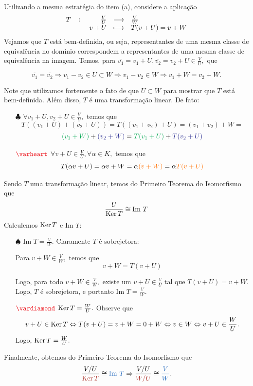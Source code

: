 \documentclass[11pt,a4paper]{article}
\begin{document}
{{    \task[\pers{b}] Utilizando a mesma estratégia do item (a), considere a aplicação
    \[
    \fullfunction{T}{\frac{V}{U}}{\frac{V}{W}}{v + U}{T(v + U) = v + W}
    \]
    }
    Vejamos que $T$ está bem-definida, ou seja, representantes de uma mesma classe de equivalência no domínio correspondem a representantes de uma mesma classe de equivalência na imagem. Temos, para $\overline{v_1} = v_1 + U, \overline{v_2} = v_2 + U \in \frac{V}{U},$ que
    
    \[
    \overline{v_1} = \overline{v_2} \Rightarrow v_1 - v_2 \in U \subset W \Rightarrow v_1 - v_2 \in W \Rightarrow v_1 + W = v_2 + W.
    \]
    
    Note que utilizamos fortemente o fato de que $U \subset W$ para mostrar que $T$ está bem-definida. Além disso, $T$ é uma transformação linear. De fato:
    \begin{itemize}
        \item[$\clubsuit$] $\forall v_1 + U, v_2 + U \in \frac{V}{U},$ temos que
        \[  T((v_1 + U) + (v_2 + U)) = T((v_1 + v_2) + U) = (v_1 + v_2) + W = \]\[\textcolor{Green}{(v_1 + W)} + \textcolor{Blue}{(v_2 + W)} = \textcolor{Green}{T(v_1 + U)} + \textcolor{Blue}{T(v_2 + U)} \]
        
        \item[$\textcolor{Red}{\varheart}$] $\forall v + U \in \frac{V}{U}, \forall \alpha \in K,$ temos que
        \[
        T(\alpha v + U) =  \alpha v + W  = \alpha \textcolor{Laranja}{(v + W)} =   \alpha \textcolor{Laranja}{T(v + U)}
        \]
    \end{itemize}
    
    Sendo $T$ uma transformação linear, temos do Primeiro Teorema do Isomorfismo que
    \[
    \frac{U}{\operatorname{Ker} T} \cong \mbox{Im } T
    \]
    Calculemos $\operatorname{Ker} T$ e $\mbox{Im } T:$
    \begin{itemize}
        \item[$\spadesuit$] $\mbox{Im } T = \frac{V}{W}.$ Claramente $T$ é sobrejetora:
        
        Para $v + W \in \frac{V}{W},$ temos que
        \[
        v + W = T(v + U)\]
        
        Logo, para todo $v + W  \in \frac{V}{W},$ existe um $v + U \in \frac{V}{U}$ tal que $T(v + U) = v + W.$ Logo, $T$ é sobrejetora, e portanto $\mbox{Im } T = \frac{V}{W}.$
        \item[$\textcolor{Red}{\vardiamond}$] $\operatorname{Ker} T = \frac{W}{U}.$ Observe que
        \[
        v + U \in \operatorname{Ker} T \Leftrightarrow T(v + U) = v + W = 0 + W \Leftrightarrow v \in W \Leftrightarrow v + U \in \frac{W}{U}.
        \]
        Logo, $\operatorname{Ker} T = \frac{W}{U}.$
    \end{itemize}
    Finalmente, obtemos do Primeiro Teorema do Isomorfismo que
    \[
    \frac{V/U}{\textcolor{Mahogany}{\Ker T}} \cong \textcolor{NavyBlue}{\mbox{Im } T} \Rightarrow \frac{V/U}{\textcolor{Mahogany}{W/U}} \cong \textcolor{NavyBlue}{\frac{V}{W}}.
    \]
    
    
    



}
\end{document}
